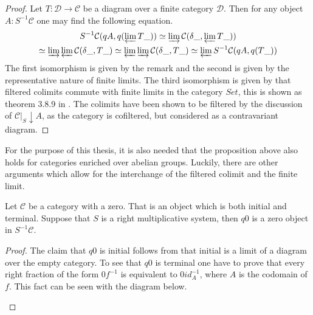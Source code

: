     \begin{proof}
        Let $T:\mathcal{D}\rightarrow\mathcal{C}$ be a diagram over a finite category $\mathcal{D}$. Then for any object $A:S^{-1}\mathcal{C}$ one may find the following equation.
        \begin{multline*}
            S^{-1}\mathcal{C}(qA,q(\varprojlim T\_))\simeq \varinjlim\mathcal{C}(\delta\_,\varprojlim T\_))\\
            \simeq \varinjlim\varprojlim\mathcal{C}(\delta\_,T\_)\simeq \varprojlim\varinjlim\mathcal{C}(\delta\_,T\_)\simeq \varprojlim S^{-1}\mathcal{C}(qA,q(T\_))
        \end{multline*}
        The first isomorphism is given by the remark and the second is given by the representative nature of finite limits. The third isomorphism is given by that filtered colimits commute with finite limits in the category $Set$, this is shown as theorem 3.8.9 in \cite{riehl}. The colimits have been shown to be filtered by the discussion of $\mathcal{C}|_{S}\downarrow A$, as the category is cofiltered, but considered as a contravariant diagram.
    \end{proof}

    \begin{remark}
        For the purpose of this thesis, it is also needed that the proposition above also holds for categories enriched over abelian groups. Luckily, there are other arguments which allow for the interchange of the filtered colimit and the finite limit.
    \end{remark}

    \begin{prop}
        Let $\mathcal{C}$ be a category with a zero. That is an object which is both initial and terminal. Suppose that $S$ is a right multiplicative system, then $q0$ is a zero object in $S^{-1}\mathcal{C}$.
    \end{prop}

    \begin{proof}
        The claim that $q0$ is initial follows from that initial is a limit of a diagram over the empty category. To see that $q0$ is terminal one have to prove that every right fraction of the form $0f^{-1}$ is equivalent to $0id_A^{-1}$, where $A$ is the codomain of $f$. This fact can be seen with the diagram below.
        \begin{center}
        \end{center}
    \end{proof}

